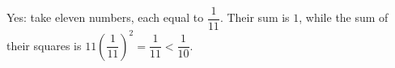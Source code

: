 Yes: take eleven numbers, each equal to $\dfrac{1}{11}$. Their sum is $1$, while the sum of their squares is $11\left(\dfrac{1}{11}\right)^2=\dfrac{1}{11}<\dfrac{1}{10}$.
